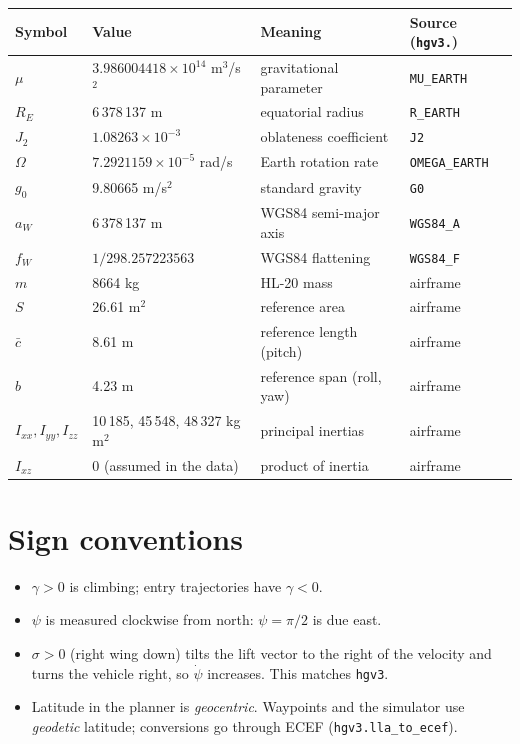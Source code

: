 \documentclass[11pt]{report}
\numberwithin{equation}{chapter}
\newcommand{\code}[1]{\texttt{#1}}
\begin{document}
\begin{center}
\begin{tabular}{@{}llll@{}}
\toprule
Symbol & Value & Meaning & Source (\code{hgv3.}) \\
\midrule
$\mu$ & $3.986004418\times10^{14}$ m$^3$/s$^2$ & gravitational parameter & \code{MU\_EARTH} \\
$R_E$ & 6\,378\,137 m & equatorial radius & \code{R\_EARTH} \\
$J_2$ & $1.08263\times10^{-3}$ & oblateness coefficient & \code{J2} \\
$\Omega$ & $7.2921159\times10^{-5}$ rad/s & Earth rotation rate & \code{OMEGA\_EARTH} \\
$g_0$ & 9.80665 m/s$^2$ & standard gravity & \code{G0} \\
$a_{W}$ & 6\,378\,137 m & WGS84 semi-major axis & \code{WGS84\_A} \\
$f_{W}$ & $1/298.257223563$ & WGS84 flattening & \code{WGS84\_F} \\
$m$ & 8664 kg & HL-20 mass & airframe \\
$S$ & 26.61 m$^2$ & reference area & airframe \\
$\bar c$ & 8.61 m & reference length (pitch) & airframe \\
$b$ & 4.23 m & reference span (roll, yaw) & airframe \\
$I_{xx}, I_{yy}, I_{zz}$ & 10\,185, 45\,548, 48\,327 kg\,m$^2$ & principal inertias & airframe \\
$I_{xz}$ & 0 (assumed in the data) & product of inertia & airframe \\
\bottomrule
\end{tabular}
\end{center}

\section{Sign conventions}

\begin{itemize}
\item $\gamma>0$ is climbing; entry trajectories have $\gamma<0$.
\item $\psi$ is measured clockwise from north: $\psi=\pi/2$ is due east.
\item $\sigma>0$ (right wing down) tilts the lift vector to the right of the velocity and
  turns the vehicle right, so $\dot\psi$ increases. This matches \code{hgv3}.
\item Latitude in the planner is \emph{geocentric}. Waypoints and the simulator use
  \emph{geodetic} latitude; conversions go through ECEF (\code{hgv3.lla\_to\_ecef}).
\end{itemize}
\end{document}
